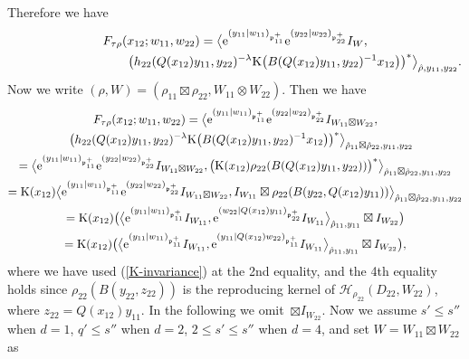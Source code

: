 \documentclass[pdftex]{sigma}
\numberwithin{equation}{section}
\newcommand{\fp}{\mathfrak{p}}
\newcommand{\cH}{\mathcal{H}}
\newcommand{\rK}{\mathrm{K}}
\begin{document}
Therefore we have
\begin{gather*}
F_{\tau\rho}(x_{12};w_{11},w_{22}) =\bigl\langle {\rm e}^{(y_{11}|w_{11})_{\fp^+_{11}}}{\rm e}^{(y_{22}|w_{22})_{\fp^+_{22}}}I_W,\\
\hphantom{F_{\tau\rho}(x_{12};w_{11},w_{22}) =\bigl\langle}{} \big(h_{22}(Q(x_{12})y_{11},y_{22})^{-\lambda}
\rK\big(B(Q(x_{12})y_{11},y_{22})^{-1}x_{12}\big)\big)^*\bigr\rangle_{\hat{\rho},y_{11},y_{22}}.
\end{gather*}
Now we write $(\rho,W)=(\rho_{11}\boxtimes\rho_{22},W_{11}\otimes W_{22})$. Then we have
\begin{gather*}
F_{\tau\rho}(x_{12};w_{11},w_{22})
=\bigl\langle {\rm e}^{(y_{11}|w_{11})_{\fp^+_{11}}}{\rm e}^{(y_{22}|w_{22})_{\fp^+_{22}}}I_{W_{11}\boxtimes W_{22}},\\
\quad \big(h_{22}(Q(x_{12})y_{11},y_{22})^{-\lambda}
\rK\big(B(Q(x_{12})y_{11},y_{22})^{-1}x_{12}\big)\big)^*\bigr\rangle_{\hat{\rho}_{11}\boxtimes\hat{\rho}_{22},y_{11},y_{22}}\\
=\bigl\langle {\rm e}^{(y_{11}|w_{11})_{\fp^+_{11}}}{\rm e}^{(y_{22}|w_{22})_{\fp^+_{22}}}I_{W_{11}\boxtimes W_{22}},
\big(\rK(x_{12})\rho_{22}(B(Q(x_{12})y_{11},y_{22}))\big)^*\bigr\rangle_{\hat{\rho}_{11}\boxtimes\hat{\rho}_{22},y_{11},y_{22}}\\
=\rK(x_{12})\bigl\langle {\rm e}^{(y_{11}|w_{11})_{\fp^+_{11}}}{\rm e}^{(y_{22}|w_{22})_{\fp^+_{22}}}I_{W_{11}\boxtimes W_{22}},
I_{W_{11}}\boxtimes\rho_{22}(B(y_{22},Q(x_{12})y_{11}))\bigr\rangle_{\hat{\rho}_{11}\boxtimes\hat{\rho}_{22},y_{11},y_{22}}\\
=\rK(x_{12})\bigl(\bigl\langle {\rm e}^{(y_{11}|w_{11})_{\fp^+_{11}}}I_{W_{11}},
{\rm e}^{(w_{22}|Q(x_{12})y_{11})_{\fp^+_{22}}}I_{W_{11}}\bigr\rangle_{\hat{\rho}_{11},y_{11}}\boxtimes I_{W_{22}}\bigr)\\
=\rK(x_{12})\bigl(\bigl\langle {\rm e}^{(y_{11}|w_{11})_{\fp^+_{11}}}I_{W_{11}},
{\rm e}^{(y_{11}|Q(x_{12})w_{22})_{\fp^+_{11}}}I_{W_{11}}\bigr\rangle_{\hat{\rho}_{11},y_{11}}\boxtimes I_{W_{22}}\bigr),
\end{gather*}
where we have used (\ref{K-invariance}) at the 2nd equality, and the 4th equality holds since $\rho_{22}(B(y_{22},\allowbreak z_{22}))$
is the reproducing kernel of $\cH_{\rho_{22}}(D_{22},W_{22})$, where $z_{22}=Q(x_{12})y_{11}$.
In the following we omit~$\boxtimes I_{W_{22}}$.
Now we assume $s'\le s''$ when $d=1$, $q'\le s''$ when $d=2$, $2\le s'\le s''$ when $d=4$, and set $W=W_{11}\boxtimes W_{22}$ as
\end{document}
